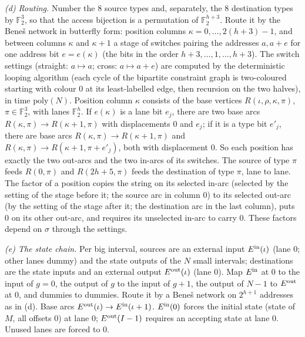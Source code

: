 \documentclass[11pt]{article}
\theoremstyle{definition}
\theoremstyle{remark}
\newcommand{\F}{\mathbb F}
\begin{document}
\emph{(d) Routing.} Number the $8$ source types and, separately, the $8$ destination types by $\F_2^3$, so that the access bijection is a
permutation of $\F_2^{h+3}$. Route it by the Bene\v{s} network in butterfly form: position columns $\kappa=0,\dots,2(h+3)-1$, and
between columns $\kappa$ and $\kappa+1$ a stage of switches pairing the addresses $a,a+e$ for one address bit $e=e(\kappa)$
(the bits in the order $h+3,\dots,1,\dots,h+3$). The switch settings (straight: $a\mapsto a$; cross: $a\mapsto a+e$) are computed
by the deterministic looping algorithm (each cycle of the bipartite constraint graph is two-coloured starting with colour $0$ at its
least-labelled edge, then recursion on the two halves), in time $\mathrm{poly}(N)$. Position column $\kappa$ consists of the base
vertices $R(\iota,\rho,\kappa,\pi)$, $\pi\in\F_2^3$, with lanes $\F_2^h$. If $e(\kappa)$ is a lane bit $e_j$, there are two base arcs
$R(\kappa,\pi)\to R(\kappa+1,\pi)$ with displacements $0$ and $e_j$; if it is a type bit $e'_j$, there are base arcs
$R(\kappa,\pi)\to R(\kappa+1,\pi)$ and $R(\kappa,\pi)\to R(\kappa+1,\pi+e'_j)$, both with displacement $0$. So each position has
exactly the two out-arcs and the two in-arcs of its switches. The source of type $\pi$ feeds $R(0,\pi)$ and $R(2h+5,\pi)$ feeds the
destination of type $\pi$, lane to lane. The factor of a position copies the string on its selected in-arc (selected by the
setting of the stage before it; the source arc in column $0$) to its selected out-arc (by the setting of the stage after it; the
destination arc in the last column), puts $0$ on its other out-arc, and requires its unselected in-arc to carry $0$. These factors
depend on $\sigma$ through the settings.

\emph{(e) The state chain.} Per big interval, sources are an external input $E^{\rm in}(\iota)$ (lane $0$; other lanes dummy) and
the state outputs of the $N$ small intervals; destinations are the state inputs and an external output $E^{\rm out}(\iota)$
(lane $0$). Map $E^{\rm in}$ at $0$ to the input of $g=0$, the output of $g$ to the input of $g+1$, the output of $N-1$ to
$E^{\rm out}$ at $0$, and dummies to dummies. Route it by a Bene\v{s} network on $2^{h+1}$ addresses as in (d). Base arcs
$E^{\rm out}(\iota)\to E^{\rm in}(\iota+1)$. $E^{\rm in}(0)$ forces the initial state (state of $M$, all offsets $0$) at lane $0$;
$E^{\rm out}(I-1)$ requires an accepting state at lane $0$. Unused lanes are forced to $0$.
\end{document}
